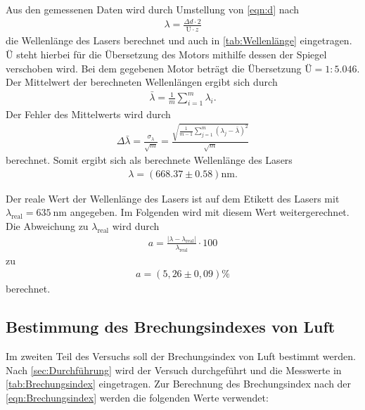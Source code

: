 Aus den gemessenen Daten wird durch Umstellung von \autoref{eqn:d} nach
\begin{align*}
  \lambda = \frac{\Delta d \cdot 2}{ Ü \cdot z}
\end{align*}
die Wellenlänge des Lasers berechnet und auch in \autoref{tab:Wellenlänge} eingetragen.
$Ü$ steht hierbei für die Übersetzung des Motors mithilfe dessen der Spiegel verschoben wird.
Bei dem gegebenen Motor beträgt die Übersetzung $Ü= 1:5.046$. 
Der Mittelwert der berechneten Wellenlängen ergibt sich durch
\begin{align}
  \bar{\lambda}=\frac{1}{m} \sum_{i=1}^m \lambda_i.
  \label{eqn:Mittelwert}
\end{align}
Der Fehler des Mittelwerts wird durch 
\begin{align}
  \Delta \bar{\lambda}= \frac{\sigma_\lambda}{\sqrt{m}} = \frac{\sqrt{\frac{1}{m-1}\sum_{j=1}^m (\lambda_j-\bar{\lambda})^2}}{\sqrt{m}}
  \label{eqn:Fehler}
\end{align}
berechnet.
Somit ergibt sich als berechnete Wellenlänge des Lasers
\begin{align*}
  \lambda= (668.37 \pm 0.58 )\si{\nano\meter}.
\end{align*}

Der reale Wert der Wellenlänge des Lasers ist auf dem Etikett des Lasers mit $\lambda_{\text{real}}=\qty{635}{\nano\meter}$ angegeben.
Im Folgenden wird mit diesem Wert weitergerechnet.
Die Abweichung zu $\lambda_{\text{real}}$ wird durch
\begin{align}
  a=\frac{|\lambda-\lambda_{\text{real}}|}{\lambda_{\text{real}}}\cdot 100 \label{eqn:abweich}
\end{align}
zu
\begin{align*}
  a=(5,26 \pm 0,09) \si{\percent}
\end{align*}
berechnet.

\subsection{Bestimmung des Brechungsindexes von Luft}
\label{sub:Brechungsindex}

Im zweiten Teil des Versuchs soll der Brechungsindex von Luft bestimmt werden.
Nach \autoref{sec:Durchführung} wird der Versuch durchgeführt und die Messwerte in \autoref{tab:Brechungsindex} eingetragen.
Zur Berechnung des Brechungsindex nach der \autoref{eqn:Brechungsindex}
werden die folgenden Werte verwendet:

